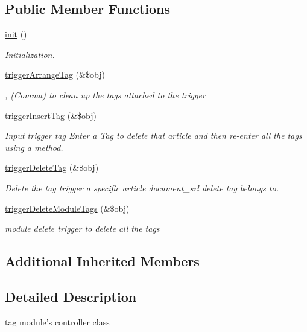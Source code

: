 \subsection*{Public Member Functions}
\begin{DoxyCompactItemize}
\item 
\hyperlink{classtagController_ada37b0f9e302b94d20dcc5f7168afb3b}{init} ()
\begin{DoxyCompactList}\small\item\em Initialization. \end{DoxyCompactList}\item 
\hyperlink{classtagController_a22edcccfa0ab6967230adf5a3d1bab27}{trigger\-Arrange\-Tag} (\&\$obj)
\begin{DoxyCompactList}\small\item\em , (Comma) to clean up the tags attached to the trigger \end{DoxyCompactList}\item 
\hyperlink{classtagController_ae17dc9d2d9f4d1193c4bb76e2296a060}{trigger\-Insert\-Tag} (\&\$obj)
\begin{DoxyCompactList}\small\item\em Input trigger tag Enter a Tag to delete that article and then re-\/enter all the tags using a method. \end{DoxyCompactList}\item 
\hyperlink{classtagController_a10bdcf92aea9f67d9c827d910e4454c9}{trigger\-Delete\-Tag} (\&\$obj)
\begin{DoxyCompactList}\small\item\em Delete the tag trigger a specific article document\-\_\-srl delete tag belongs to. \end{DoxyCompactList}\item 
\hyperlink{classtagController_a923a01c674ed2ad08b6e25e88f1001cf}{trigger\-Delete\-Module\-Tags} (\&\$obj)
\begin{DoxyCompactList}\small\item\em module delete trigger to delete all the tags \end{DoxyCompactList}\end{DoxyCompactItemize}
\subsection*{Additional Inherited Members}


\subsection{Detailed Description}
tag module's controller class 

